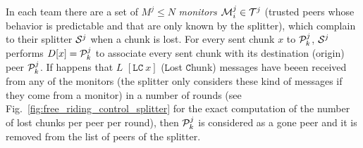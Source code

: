 In each team there are a set of $M^j\leq N$ \emph{monitors} ${\cal
M}^j_i\in {\cal T}^j$ (trusted peers whose behavior is predictable and
that are only known by the splitter), which complain to their splitter
${\cal S}^j$ when a chunk is lost. For every sent chunk $x$ to ${\cal
P}^j_k$, ${\cal S}^j$ performs $D[x]={\cal P}^j_k$ to associate every
sent chunk with its destination (origin) peer ${\cal P}^j_k$. If
happens that $L$ $[\mathtt{LC}~x]$ ($\mathtt{L}$ost $\mathtt{C}$hunk)
messages have beeen received from any of the monitors (the splitter
only considers these kind of messages if they come from a monitor) in
a number of rounds (see Fig.~\ref{fig:free_riding_control_splitter}
for the exact computation of the number of lost chunks per peer per
round), then ${\cal P}^j_k$ is considered as a gone peer and it is
removed from the list of peers of the splitter.

